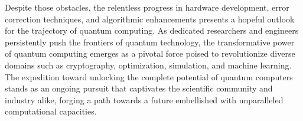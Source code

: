 \documentclass[
  journal=largetwo,
  year=2023,
]{cup-journal}
\begin{document}
Despite those obstacles, the relentless progress in hardware development, error correction techniques, and algorithmic enhancements presents a hopeful outlook for the trajectory of quantum computing. As dedicated researchers and engineers persistently push the frontiers of quantum technology, the transformative power of quantum computing emerges as a pivotal force poised to revolutionize diverse domains such as cryptography, optimization, simulation, and machine learning. The expedition toward unlocking the complete potential of quantum computers stands as an ongoing pursuit that captivates the scientific community and industry alike, forging a path towards a future embellished with unparalleled computational capacities.

\printendnotes

\printbibliography

\appendix


\end{document}
